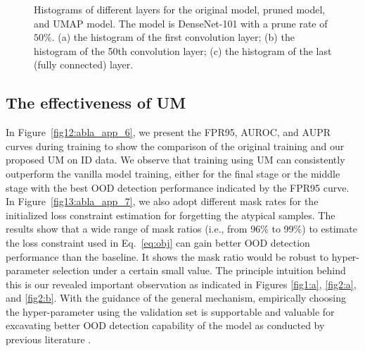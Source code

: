 \documentclass{article}
\theoremstyle{plain}
\theoremstyle{definition}
\theoremstyle{remark}
\begin{document}
\begin{figure}[h!]
    \begin{center}
    \end{center}
    \caption{Histograms of different layers for the original model, pruned model, and UMAP model. The model is DenseNet-101 with a prune rate of $50\%$. (a) the histogram of the first convolution layer; (b) the histogram of the 50th convolution layer; (c) the histogram of the last (fully connected) layer.}
    \label{fig14:abla_app_8}
\end{figure}

\subsection{The effectiveness of UM}
\label{app:eff_um}

In Figure~\ref{fig12:abla_app_6}, we present the FPR95, AUROC, and AUPR curves during training to show the comparison of the original training and our proposed UM on ID data. We observe that training using UM can consistently outperform the vanilla model training, either for the final stage or the middle stage with the best OOD detection performance indicated by the FPR95 curve. In Figure~\ref{fig13:abla_app_7}, we also adopt different mask rates for the initialized loss constraint estimation for forgetting the atypical samples. The results show that a wide range of mask ratios (i.e., from 96\% to 99\%) to estimate the loss constraint used in Eq.~\eqref{eq:obj} can gain better OOD detection performance than the baseline. It shows the mask ratio would be robust to hyper-parameter selection under a certain small value. The principle intuition behind this is our revealed important observation as indicated in Figures \ref{fig1:a}, \ref{fig2:a}, and \ref{fig2:b}. With the guidance of the general mechanism, empirically choosing the hyper-parameter using the validation set is supportable and valuable for excavating better OOD detection capability of the model as conducted by previous literature \citep{hendrycks2018deep,liu2020energy,sun2021react}.
\end{document}
